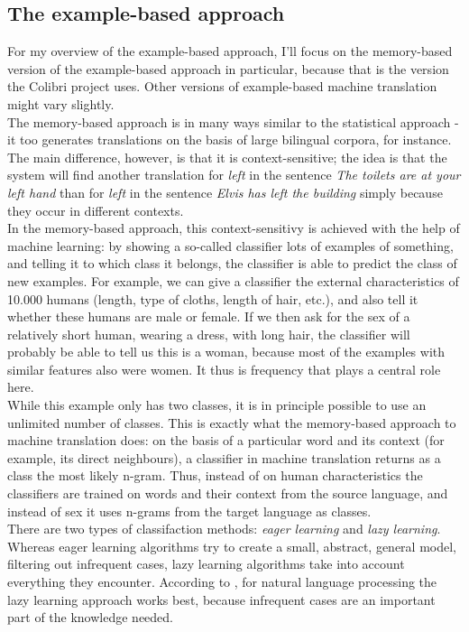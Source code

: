 \documentclass[12pt]{article}
\begin{document}
\subsection{The example-based approach}

For my overview of the example-based approach, I'll focus on the memory-based version of the example-based approach in particular, because that is the version the Colibri project uses. Other versions of example-based machine translation might vary slightly. \\\indent
The memory-based approach is in many ways similar to the statistical approach - it too generates translations on the basis of large bilingual corpora, for instance. The main difference, however, is that it is context-sensitive; the idea is that the system will find another translation for \emph{left} in the sentence \emph{The toilets are at your left hand} than for \emph{left} in the sentence \emph{Elvis has left the building} simply because they occur in different contexts. \\\indent
In the memory-based approach, this context-sensitivy is achieved with the help of machine learning: by showing a so-called classifier lots of examples of something, and telling it to which class it belongs, the classifier is able to predict the class of new examples. For example, we can give a classifier the external characteristics of 10.000 humans (length, type of cloths, length of hair, etc.), and also tell it whether these humans are male or female. If we then ask for the sex of a relatively short human, wearing a dress, with long hair, the classifier will probably be able to tell us this is a woman, because most of the examples with similar features also were women. It thus is frequency that plays a central role here.\\\indent
While this example only has two classes, it is in principle possible to use an unlimited number of classes. This is exactly what the memory-based approach to machine translation does: on the basis of a particular word and its context (for example, its direct neighbours), a classifier in machine translation returns as a class the most likely n-gram. Thus, instead of on human characteristics the classifiers are trained on words and their context from the source language, and instead of sex it uses n-grams from the target language as classes. \\\indent
There are two types of classifaction methods: \emph{eager learning} and \emph{lazy learning}. Whereas eager learning algorithms try to create a small, abstract, general model, filtering out infrequent cases, lazy learning algorithms take into account everything they encounter. According to \citet{dvdb05}, for natural language processing the lazy learning approach works best, because infrequent cases are an important part of the knowledge needed. \\\indent
\end{document}
